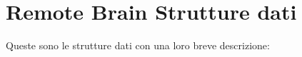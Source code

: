 \section{Remote Brain Strutture dati}
Queste sono le strutture dati con una loro breve descrizione:\begin{CompactList}
\item{}
\item{}
\end{CompactList}

